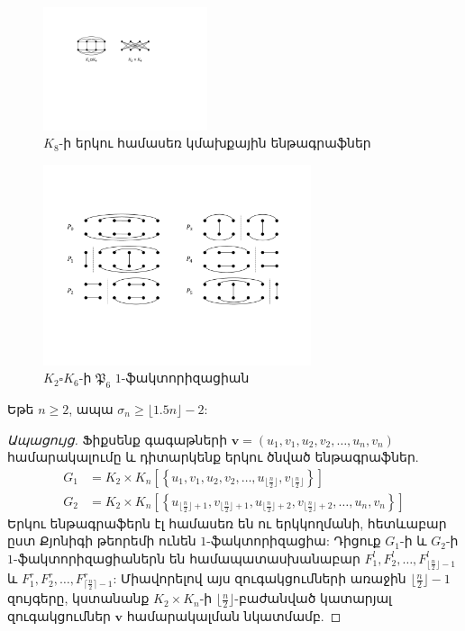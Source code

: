 \begin{hide}
\begin{figure}[b!]
\centering
\includegraphics[width=0.43\textwidth]{figures/K_8products.pdf}
\caption{$K_8$-ի երկու համասեռ կմախքային ենթագրաֆներ}
\label{K_8products}
\end{figure}

\begin{figure}[t!]
\centering
\includegraphics[width=0.7\textwidth]{figures/P_6.pdf}
\caption{$K_2 \square K_6$-ի $\mathfrak{P}_6$ $1$-ֆակտորիզացիան}
\label{P_6}
\end{figure}

\begin{lemma}\label{l35n3}
Եթե $n \geq 2$, ապա $\sigma_n \geq \lfloor 1.5n \rfloor - 2$:
\end{lemma}
\begin{proof}[Ապացույց]
Ֆիքսենք գագաթների $\mathbf{v} = \left(u_1,v_1,u_2,v_2,\ldots,u_n,v_n\right)$ համարակալումը և դիտարկենք երկու ծնված ենթագրաֆներ.
\begin{align*}
G_1 &= K_2 \times K_n\left[\left\{u_1,v_1,u_2,v_2,\ldots,u_{\lfloor\frac{n}{2}\rfloor},v_{\lfloor\frac{n}{2}\rfloor}\right\}\right]\\ 
G_2 &= K_2 \times K_n\left[\left\{u_{\lfloor\frac{n}{2}\rfloor + 1},v_{\lfloor\frac{n}{2}\rfloor + 1},
u_{\lfloor\frac{n}{2}\rfloor + 2},v_{\lfloor\frac{n}{2}\rfloor + 2},\ldots,u_n,v_n \right\}\right]
\end{align*}
Երկու ենթագրաֆերն էլ համասեռ են ու երկկողմանի, հետևաբար ըստ Քյոնիգի թեորեմի \cite{Konig1916} ունեն $1$-ֆակտորիզացիա: Դիցուք $G_1$-ի և $G_2$-ի $1$-ֆակտորիզացիաներն են համապատասխանաբար $F^l_1,F^l_2,\ldots,F^l_{\lfloor\frac{n}{2}\rfloor-1}$ և $F^r_1,F^r_2,\ldots,F^r_{\lceil\frac{n}{2}\rceil-1}$: Միավորելով այս զուգակցումների առաջին $\lfloor\frac{n}{2}\rfloor-1$ զույգերը, կստանանք $K_2 \times K_n$-ի $\lfloor\frac{n}{2}\rfloor$-բաժանված կատարյալ զուգակցումներ $\mathbf{v}$ համարակալման նկատմամբ.


\end{proof}
\end{hide}
